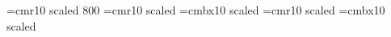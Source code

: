 \font\eightrm=cmr10 scaled 800
\font\twelverm=cmr10 scaled 
\font\twelvebf=cmbx10 scaled 
\font\fourteenrm=cmr10 scaled 
\font\fourteenbf=cmbx10 scaled 


\def\chapter#1#2{\bigskip
\sectioncount=0
\equationcount=0
\hfil{\twelvebf Chapter #1}
\medskip
\hfil{\fourteenbf #2}
\bigskip
\def\thechapter{#1}}


\def\appendix#1#2{\bigskip
\sectioncount=0
\equationcount=0
\hfil{\twelvebf Appendix #1}
\medskip
\hfil{\fourteenbf #2}
\bigskip
\def\thechapter{#1}}

\def\thechapter{1}


\countdef{}
\countdef{}
\countdef{}
\def\section#1{\advance\sectioncount by 1\subsectioncount=1
\bigskip\noindent{\bf\S\thechapter.\the\sectioncount\ #1}\par
\nobreak\medskip}

\def\subsection#1{\advance\subsectioncount by 1
\bigskip\noindent{\bf#1}\par\nobreak\medskip}

\def\nosection#1{\bigskip\noindent{\bf#1}\par\nobreak\medskip}



\def\sect#1{\advance\sectioncount by1\subsectioncount=0
\nobreak\bigskip\noindent{\bf\the\sectioncount. #1}\par\medskip}

\def\subsect#1{\advance\subsectioncount by 1\subsubsectioncount=0
\bigskip\noindent{\bf\the\sectioncount.\the\subsectioncount\ #1}\par
\nobreak\medskip}

\def\subsubsect#1{\advance\subsubsectioncount by 1
\bigskip\noindent
{\bf\the\sectioncount.\the\subsectioncount.\the\subsubsectioncount\ #1}\par
\nobreak\medskip}

\def\nosect#1{\bigskip\noindent{\bf#1}\par\nobreak\medskip}



